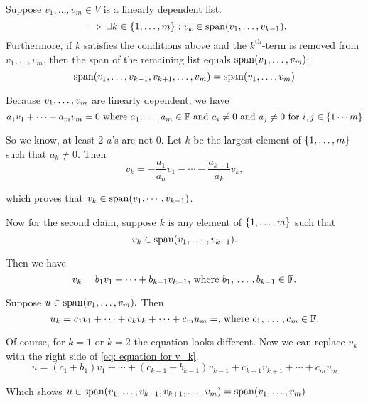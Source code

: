 
\setcounter{thm}{18}
\begin{thm} 
  \label{thm: linear dependence lemma}
  Suppose $v_{1}, \dots, v_{m}\in V$ is a linearly dependent list.
  \begin{equation}
    \implies \exists k \in \{ 1, \dots, m \} : v_k \in \operatorname{span} (v_1, \dots, v_{k-1}).
  \end{equation}
  Furthermore, if $k$ satisfies the conditions above and the $k^{\text{th}}$-term is removed from $v_1, \dots, v_m$, then the span of the remaining list equals $\operatorname{span} (v_1, \dots, v_{m})$:
  \begin{equation}
    \operatorname{span} (v_1, \dots, v_{k-1}, v_{k+1}, \dots, v_m) = \operatorname{span} (v_1, \dots, v_m)
  \end{equation}
\end{thm}
\begin{prf}
  Because $v_1, \dots, v_m$ are linearly dependent, we have
  \begin{equation}
    a_1 v_1 + \cdots + a_m v_m = 0
    $ where $a_1, \ldots, a_m \in \myF$ and $a_i \neq 0$ and $a_j \neq 0 $ for $i,j \in \{1 \cdots m\}
  \end{equation}

  So we know, at least $2$ $a$'s are not $0$.
  Let $k$ be the largest element of $\{ 1, \ldots, m \}$ such that $a_k \neq 0$. Then
  \begin{equation}
    v_k = - \frac{a_1}{a_n}v_1 - \cdots - \frac{a_{k-1}}{a_k}v_k,
  \end{equation}

  which proves that $v_k \in \operatorname{span} (v_1, \cdots, v_{k-1})$.

  Now for the second claim, suppose $k$ is any element of $\{ 1, \ldots, m \}$ such that
  \begin{equation}
    v_k \in \operatorname{span} (v_1, \cdots, v_{k-1}).
  \end{equation}

  Then we have
  \begin{equation}
    v_k = b_1v_1 + \cdots + b_{k-1}v_{k-1}, $ where $b_1, \ddd, b_{k-1} \in \myF.
    \label{eq: equation for v_k}
  \end{equation}

  Suppose $u \in \operatorname{span} (v_1, \ldots, v_m).$ Then
  \begin{equation}
  u_k = c_1v_1 + \cdots + c_kv_k + \cdots +c_{m}u_{m} = , $ where $c_1, \ddd, c_{m} \in \myF.
  \end{equation}

  Of course, for $k=1$ or $k=2$ the equation looks different. Now we can replace $v_k$ with the right side of \ref{eq: equation for v_k}.
  \begin{equation}
    u = (c_1+b_1)v_1 + \cdots + (c_{k-1} + b_{k-1})v_{k-1} + c_{k+1} v_{k+1} + \cdots + c_m v_m
  \end{equation}

  Which shows $u \in \operatorname{span} (v_1, \dots, v_{k-1}, v_{k+1}, \dots, v_m) = \operatorname{span} (v_1, \dots, v_m)$
\end{prf}
\setcounter{thm}{21}

